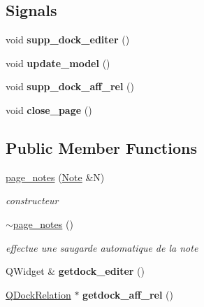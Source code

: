 \subsection*{Signals}
\begin{DoxyCompactItemize}
\item 
\mbox{\label{classpage__notes_a5b8f0db068908857d83afa630b8e4a86}} 
void {\bfseries supp\+\_\+dock\+\_\+editer} ()
\item 
\mbox{\label{classpage__notes_ab0e939533b6d2ceea5c94d7c4739e0cb}} 
void {\bfseries update\+\_\+model} ()
\item 
\mbox{\label{classpage__notes_ac0ee46fc4c828960556fff31762fcffa}} 
void {\bfseries supp\+\_\+dock\+\_\+aff\+\_\+rel} ()
\item 
\mbox{\label{classpage__notes_a53cde94ca69c6d560578b53560e72170}} 
void {\bfseries close\+\_\+page} ()
\end{DoxyCompactItemize}
\subsection*{Public Member Functions}
\begin{DoxyCompactItemize}
\item 
\hyperlink{classpage__notes_ad9a1b3dbe6c7901ed37a5784b1094fa6}{page\+\_\+notes} (\hyperlink{class_note}{Note} \&N)
\begin{DoxyCompactList}\small\item\em constructeur \end{DoxyCompactList}\item 
\hyperlink{classpage__notes_a736d7d7d13818c43a20b20127845c6c0}{$\sim$page\+\_\+notes} ()
\begin{DoxyCompactList}\small\item\em effectue une saugarde automatique de la note \end{DoxyCompactList}\item 
\mbox{\label{classpage__notes_ab2beff1e0ece138a3a7e1419bfa8fbde}} 
Q\+Widget \& {\bfseries getdock\+\_\+editer} ()
\item 
\mbox{\label{classpage__notes_a6516f7d84e5a7f9cb06d733aa4a02697}} 
\hyperlink{class_q_dock_relation}{Q\+Dock\+Relation} $\ast$ {\bfseries getdock\+\_\+aff\+\_\+rel} ()
\end{DoxyCompactItemize}
